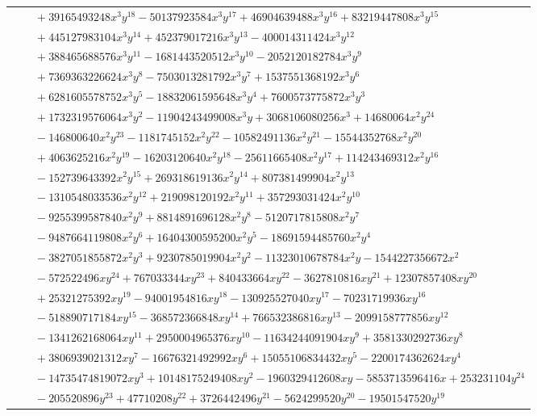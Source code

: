 \documentclass[11pt]{article}
\begin{document}
\begin{longtable}{@{}ll@{}}
 & $\quad +39165493248x^{3}y^{18}-50137923584x^{3}y^{17}+46904639488x^{3}y^{16}+83219447808x^{3}y^{15}$\\
 & $\quad +445127983104x^{3}y^{14}+452379017216x^{3}y^{13}-400014311424x^{3}y^{12}$\\
 & $\quad +388465688576x^{3}y^{11}-1681443520512x^{3}y^{10}-2052120182784x^{3}y^{9}$\\
 & $\quad +7369363226624x^{3}y^{8}-7503013281792x^{3}y^{7}+1537551368192x^{3}y^{6}$\\
 & $\quad +6281605578752x^{3}y^{5}-18832061595648x^{3}y^{4}+7600573775872x^{3}y^{3}$\\
 & $\quad +1732319576064x^{3}y^{2}-11904243499008x^{3}y+3068106080256x^{3}+14680064x^{2}y^{24}$\\
 & $\quad -146800640x^{2}y^{23}-1181745152x^{2}y^{22}-10582491136x^{2}y^{21}-15544352768x^{2}y^{20}$\\
 & $\quad +4063625216x^{2}y^{19}-16203120640x^{2}y^{18}-25611665408x^{2}y^{17}+114243469312x^{2}y^{16}$\\
 & $\quad -152739643392x^{2}y^{15}+269318619136x^{2}y^{14}+807381499904x^{2}y^{13}$\\
 & $\quad -1310548033536x^{2}y^{12}+219098120192x^{2}y^{11}+357293031424x^{2}y^{10}$\\
 & $\quad -9255399587840x^{2}y^{9}+8814891696128x^{2}y^{8}-5120717815808x^{2}y^{7}$\\
 & $\quad -9487664119808x^{2}y^{6}+16404300595200x^{2}y^{5}-18691594485760x^{2}y^{4}$\\
 & $\quad -3827051855872x^{2}y^{3}+9230785019904x^{2}y^{2}-11323010678784x^{2}y-1544227356672x^{2}$\\
 & $\quad -572522496xy^{24}+767033344xy^{23}+840433664xy^{22}-3627810816xy^{21}+12307857408xy^{20}$\\
 & $\quad +25321275392xy^{19}-94001954816xy^{18}-130925527040xy^{17}-70231719936xy^{16}$\\
 & $\quad -518890717184xy^{15}-368572366848xy^{14}+766532386816xy^{13}-2099158777856xy^{12}$\\
 & $\quad -1341262168064xy^{11}+2950004965376xy^{10}-11634244091904xy^{9}+3581330292736xy^{8}$\\
 & $\quad +3806939021312xy^{7}-16676321492992xy^{6}+15055106834432xy^{5}-2200174362624xy^{4}$\\
 & $\quad -14735474819072xy^{3}+10148175249408xy^{2}-1960329412608xy-5853713596416x+253231104y^{24}$\\
 & $\quad -205520896y^{23}+47710208y^{22}+3726442496y^{21}-5624299520y^{20}-19501547520y^{19}$\\

\end{longtable}
\end{document}

